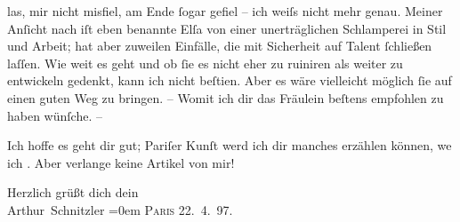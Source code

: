                las, mir nicht {\pb}misfiel, am Ende ſogar gefiel – ich weiſs nicht mehr genau. Meiner Anſicht nach iſt
               eben benannte Elſa von einer unerträglichen
               Schlamperei in Stil und Arbeit; hat aber zuweilen Einfälle, die mit Sicherheit auf
               Talent ſchließen laſſen. Wie weit es geht und ob ſie es nicht eher {\pb}\introOben{}zu\introOben{} ruiniren als weiter zu entwickeln gedenkt, kann ich
               nicht beſti{\geminationm}en. Aber es wäre vielleicht möglich ſie auf
               einen guten Weg zu bringen. – Womit ich dir das Fräulein beſtens empfohlen zu haben
               wünſche. –\pend
           
\pstart
           Ich hoffe es geht dir gut; Pariſer Kunſt {\pb}werd ich dir manches
               erzählen können, we{\geminationn} ich \label{K_L00668-3v}\label{K_L00668-3}. Aber verlange keine Artikel von mir! \pend
           
\pstart
           Herzlich grüßt dich dein{\\[\baselineskip]}\spacefill\mbox{Arthur Schnitzler}\pend
           \leftskip=0em{}
\pstart
           \textsc{Paris}{ }22. 4. 97.\pend
           \endnumbering{}  
      